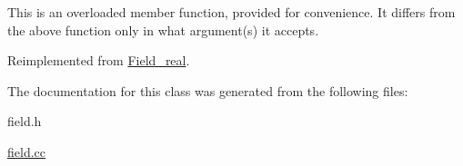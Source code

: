 This is an overloaded member function, provided for convenience. It differs from the above function only in what argument(s) it accepts.

Reimplemented from \mbox{\hyperlink{classField__real_aab922b4da48c1fd508344b1f627e0e0e}{Field\+\_\+real}}.



The documentation for this class was generated from the following files\+:\begin{DoxyCompactItemize}
\item 
field.\+h\item 
\mbox{\hyperlink{field_8cc}{field.\+cc}}\end{DoxyCompactItemize}
